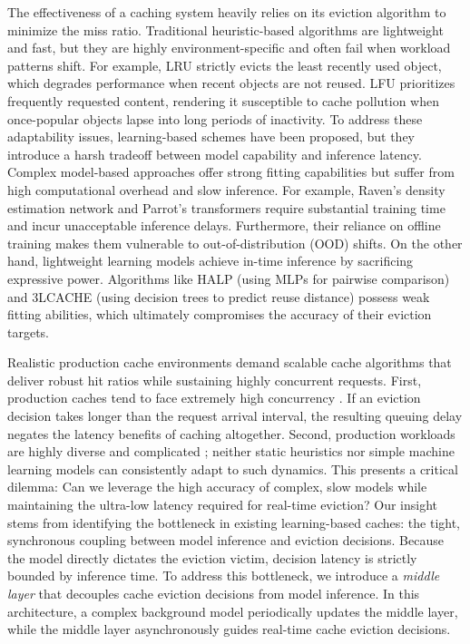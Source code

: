 \documentclass[10pt,journal]{IEEEtran}
\theoremstyle{slantedlemma}
\begin{document}
The effectiveness of a caching system heavily relies on its eviction algorithm to minimize the miss ratio.
Traditional heuristic-based algorithms \cite{oneilLRUK1993,dongheeleeLRFU2001,jiangLIRS2002,megiddoARC2003,einzigerTinyLFU2017,zhangSIEVE2024,yangs3FIFO2023} are lightweight and fast, but they are highly environment-specific and often fail when workload patterns shift. For example, LRU strictly evicts the least recently used object, which degrades performance when recent objects are not reused. LFU prioritizes frequently requested content, rendering it susceptible to cache pollution when once-popular objects lapse into long periods of inactivity.
To address these adaptability issues, learning-based schemes have been proposed, but they introduce a harsh tradeoff between model capability and inference latency.
Complex model-based approaches \cite{liuImitation2020, huRaven2022, wangLRUBase2024} offer strong fitting capabilities but suffer from high computational overhead and slow inference. For example, Raven's density estimation network and Parrot's transformers require substantial training time and incur unacceptable inference delays. Furthermore, their reliance on offline training makes them vulnerable to out-of-distribution (OOD) shifts.
On the other hand, lightweight learning models \cite{songHALP2023, zhou3Lcache2025, vietrLeCaR2018, rodriguezCACHEUS2021} achieve in-time inference by sacrificing expressive power. Algorithms like HALP (using MLPs for pairwise comparison) and 3LCACHE (using decision trees to predict reuse distance) possess weak fitting abilities, which ultimately compromises the accuracy of their eviction targets.

Realistic production cache environments demand scalable cache algorithms that deliver robust hit ratios while sustaining highly concurrent requests.
First, production caches tend to face extremely high concurrency \cite{yangLargeScaleTwitter2021,songHALP2023}. If an eviction decision takes longer than the request arrival interval, the resulting queuing delay negates the latency benefits of caching altogether. Second, production workloads are highly diverse and complicated \cite{yangs3FIFO2023}; neither static heuristics nor simple machine learning models can consistently adapt to such dynamics.
This presents a critical dilemma: Can we leverage the high accuracy of complex, slow models while maintaining the ultra-low latency required for real-time eviction? Our insight stems from identifying the bottleneck in existing learning-based caches: the tight, synchronous coupling between model inference and eviction decisions. Because the model directly dictates the eviction victim, decision latency is strictly bounded by inference time.
To address this bottleneck, we introduce a \emph{middle layer} that decouples cache eviction decisions from model inference. In this architecture, a complex background model periodically updates the middle layer, while the middle layer asynchronously guides real-time cache eviction decisions.
\end{document}
